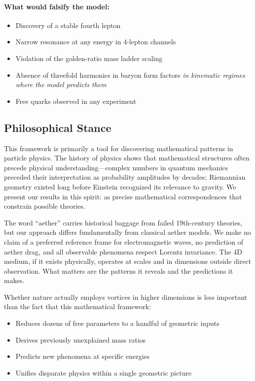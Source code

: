 \paragraph{What would falsify the model:}
\begin{itemize}
\item Discovery of a stable fourth lepton
\item Narrow resonance at any energy in 4-lepton channels
\item Violation of the golden-ratio mass ladder scaling
\item Absence of threefold harmonics in baryon form factors \emph{in kinematic regimes where the model predicts them}
\item Free quarks observed in any experiment
\end{itemize}

\subsection{Philosophical Stance}

This framework is primarily a tool for discovering mathematical patterns in particle physics. The history of physics shows that mathematical structures often precede physical understanding---complex numbers in quantum mechanics preceded their interpretation as probability amplitudes by decades; Riemannian geometry existed long before Einstein recognized its relevance to gravity. We present our results in this spirit: as precise mathematical correspondences that constrain possible theories.

The word ``aether'' carries historical baggage from failed 19th-century theories, but our approach differs fundamentally from classical aether models. We make no claim of a preferred reference frame for electromagnetic waves, no prediction of aether drag, and all observable phenomena respect Lorentz invariance. The 4D medium, if it exists physically, operates at scales and in dimensions outside direct observation. What matters are the patterns it reveals and the predictions it makes.

Whether nature actually employs vortices in higher dimensions is less important than the fact that this mathematical framework:
\begin{itemize}
\item Reduces dozens of free parameters to a handful of geometric inputs
\item Derives previously unexplained mass ratios
\item Predicts new phenomena at specific energies
\item Unifies disparate physics within a single geometric picture
\end{itemize}

